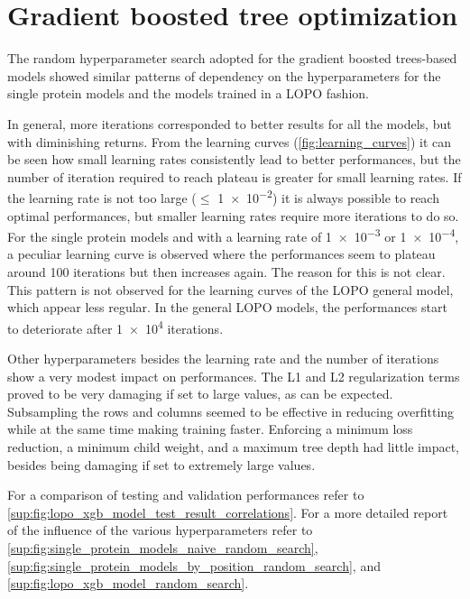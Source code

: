 \section{Gradient boosted tree optimization}
The random hyperparameter search adopted for the gradient boosted trees-based models showed similar patterns of dependency on the hyperparameters for the single protein models and the models trained in a LOPO fashion.

In general, more iterations corresponded to better results for all the models, but with diminishing returns.
From the learning curves (\autoref{fig:learning_curves}) it can be seen how small learning rates consistently lead to better performances, but the number of iteration required to reach plateau is greater for small learning rates.
If the learning rate is not too large ($\leq$ \num{1e-2}) it is always possible to reach optimal performances, but smaller learning rates require more iterations to do so.
For the single protein models and with a learning rate of \num{1e-3} or \num{1e-4}, a peculiar learning curve is observed where the performances seem to plateau around \num{100} iterations but then increases again.
The reason for this is not clear.
This pattern is not observed for the learning curves of the LOPO general model, which appear less regular.
In the general LOPO models, the performances start to deteriorate after \num{1e4} iterations.

Other hyperparameters besides the learning rate and the number of iterations show a very modest impact on performances.
The L1 and L2 regularization terms proved to be very damaging if set to large values, as can be expected.
Subsampling the rows and columns seemed to be effective in reducing overfitting while at the same time making training faster.
Enforcing a minimum loss reduction, a minimum child weight, and a maximum tree depth had little impact, besides being damaging if set to extremely large values.

For a comparison of testing and validation performances refer to \autoref{sup:fig:lopo_xgb_model_test_result_correlations}.
For a more detailed report of the influence of the various hyperparameters refer to \autoref{sup:fig:single_protein_models_naive_random_search}, \autoref{sup:fig:single_protein_models_by_position_random_search}, and \autoref{sup:fig:lopo_xgb_model_random_search}.

